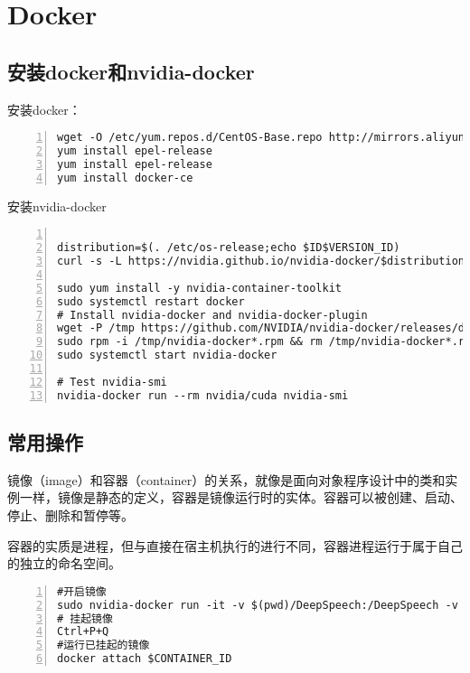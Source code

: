 \chapter{Docker}
\section{安装docker和nvidia-docker}
安装docker：
\begin{lstlisting}[language = shell, numbers=left, 
         numberstyle=\tiny,keywordstyle=\color{blue!70},
         commentstyle=\color{red!50!green!50!blue!50},frame=shadowbox,
         rulesepcolor=\color{red!20!green!20!blue!20},basicstyle=\ttfamily]
wget -O /etc/yum.repos.d/CentOS-Base.repo http://mirrors.aliyun.com/repo/Centos-7.repo  
yum install epel-release
yum install epel-release
yum install docker-ce
\end{lstlisting}

安装nvidia-docker
\begin{lstlisting}[language = shell, numbers=left, 
         numberstyle=\tiny,keywordstyle=\color{blue!70},
         commentstyle=\color{red!50!green!50!blue!50},frame=shadowbox,
         rulesepcolor=\color{red!20!green!20!blue!20},basicstyle=\ttfamily]

distribution=$(. /etc/os-release;echo $ID$VERSION_ID)
curl -s -L https://nvidia.github.io/nvidia-docker/$distribution/nvidia-docker.repo | sudo tee /etc/yum.repos.d/nvidia-docker.repo

sudo yum install -y nvidia-container-toolkit
sudo systemctl restart docker
# Install nvidia-docker and nvidia-docker-plugin
wget -P /tmp https://github.com/NVIDIA/nvidia-docker/releases/download/v1.0.1/nvidia-docker-1.0.1-1.x86_64.rpm
sudo rpm -i /tmp/nvidia-docker*.rpm && rm /tmp/nvidia-docker*.rpm
sudo systemctl start nvidia-docker

# Test nvidia-smi
nvidia-docker run --rm nvidia/cuda nvidia-smi
\end{lstlisting}

\section{常用操作}
镜像（image）和容器（container）的关系，就像是面向对象程序设计中的类和实例一样，镜像是静态的定义，容器是镜像运行时的实体。容器可以被创建、启动、停止、删除和暂停等。

容器的实质是进程，但与直接在宿主机执行的进行不同，容器进程运行于属于自己的独立的命名空间。
\begin{lstlisting}[language = shell, numbers=left, 
         numberstyle=\tiny,keywordstyle=\color{blue!70},
         commentstyle=\color{red!50!green!50!blue!50},frame=shadowbox,
         rulesepcolor=\color{red!20!green!20!blue!20},basicstyle=\ttfamily]
#开启镜像
sudo nvidia-docker run -it -v $(pwd)/DeepSpeech:/DeepSpeech -v /data1/asr_data:/mnt/data -v //data/kaldi/2019_0521_kaldi/kaldi-master:/mnt/kaldi paddlepaddle/deep_speech:latest-gpu /bin/bash
# 挂起镜像
Ctrl+P+Q
#运行已挂起的镜像
docker attach $CONTAINER_ID
\end{lstlisting}

